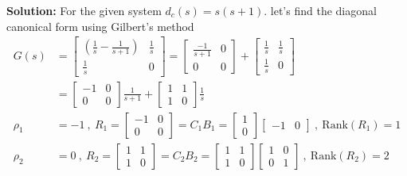 \documentclass[twoside]{article}
\begin{document}
\textbf{Solution:} For the given system $d_c(s) = s(s+1)$. let's find the diagonal canonical form using Gilbert's method
\begin{align*}
	G(s) &= \left[ \begin{array}{cc} \left( \frac{ 1 }{ s }  - \frac{ 1 }{ s + 1 } \right) &
	        \frac{ 1 }{ s }  \\ 	\frac{ 1 }{ s } & 0  \end{array} \right]   = 
	\left[ \begin{array}{cc} \frac{ -1 }{ s + 1 }  & 0 \\ 0 & 0 \end{array} \right]  
	+ \left[ \begin{array}{cc} \frac{ 1 }{ s }  & \frac{ 1 }{ s } \\ \frac{ 1 }{ s } & 0 \end{array} \right] 
	\\ &= \left[ \begin{array}{cc} -1 & 0 \\ 0 & 0  \end{array} \right] \frac{ 1 }{ s + 1 }  + \left[ \begin{array}{cc} 1 & 1 \\ 1 & 0 \end{array} \right] \frac{ 1 }{ s }  
	     \\
	    \rho_1 & = -1 \ , \ R_1 = \left[ \begin{array}{cc} -1
	       & 0 \\ 0 & 0  \end{array} \right] = C_1 B_1 = \left[ \begin{array}{c} 1 \\ 0  \end{array} \right] \left[ \begin{array}{cc} -1 
	       & 0  \end{array} \right] \ , \ \mathrm{Rank}(R_1) = 1
	       \\
	       	     \rho_2 & = 0 \ , \ R_2 = \left[ \begin{array}{cc} 1
	       & 1  \\ 1 & 0 \end{array} \right] = C_2 B_2 = \left[ \begin{array}{cc} 1
	       & 1  \\ 1 & 0 \end{array} \right] \left[ \begin{array}{cc} 1
	       & 0 \\ 0 & 1  \end{array} \right] \ , \ \mathrm{Rank}(R_2) = 2
\end{align*}
\end{document}
